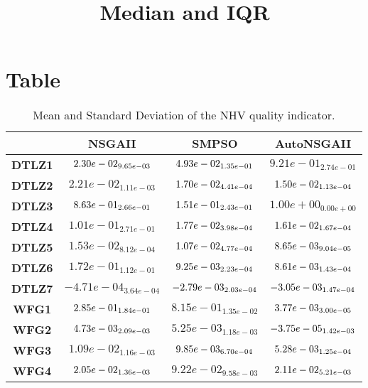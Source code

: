 \documentclass{article}
\title{Median and IQR}
\author{}
\begin{document}
\maketitle
\section{Table}
\begin{table}[!htp]
  \caption{Mean and Standard Deviation of the NHV quality indicator.}
  \label{table:NHV}
  \centering
  \begin{scriptsize}
  \begin{tabular}{c|ccc}
      & \textbf{NSGAII} & \textbf{SMPSO} & \textbf{AutoNSGAII} \\\hline
      \textbf{DTLZ1} & $\cellcolor{gray95} 2.30e-02_{9.65e-03} $ & $ \cellcolor{gray25} 4.93e-02_{1.35e-01} $ & $ 9.21e-01_{2.74e-01}$ \\
      \textbf{DTLZ2} & $2.21e-02_{1.11e-03} $ & $ \cellcolor{gray25} 1.70e-02_{4.41e-04} $ & $ \cellcolor{gray95} 1.50e-02_{1.13e-04}$ \\
      \textbf{DTLZ3} & $\cellcolor{gray25} 8.63e-01_{2.66e-01} $ & $ \cellcolor{gray95} 1.51e-01_{2.43e-01} $ & $ 1.00e+00_{0.00e+00}$ \\
      \textbf{DTLZ4} & $1.01e-01_{2.71e-01} $ & $ \cellcolor{gray25} 1.77e-02_{3.98e-04} $ & $ \cellcolor{gray95} 1.61e-02_{1.67e-04}$ \\
      \textbf{DTLZ5} & $1.53e-02_{8.12e-04} $ & $ \cellcolor{gray25} 1.07e-02_{4.77e-04} $ & $ \cellcolor{gray95} 8.65e-03_{9.04e-05}$ \\
      \textbf{DTLZ6} & $1.72e-01_{1.12e-01} $ & $ \cellcolor{gray25} 9.25e-03_{2.23e-04} $ & $ \cellcolor{gray95} 8.61e-03_{1.43e-04}$ \\
      \textbf{DTLZ7} & $-4.71e-04_{3.64e-04} $ & $ \cellcolor{gray25} -2.79e-03_{2.03e-04} $ & $ \cellcolor{gray95} -3.05e-03_{1.47e-04}$ \\
      \textbf{WFG1} & $\cellcolor{gray25} 2.85e-01_{1.84e-01} $ & $ 8.15e-01_{1.35e-02} $ & $ \cellcolor{gray95} 3.77e-03_{3.00e-05}$ \\
      \textbf{WFG2} & $\cellcolor{gray25} 4.73e-03_{2.09e-03} $ & $ 5.25e-03_{1.18e-03} $ & $ \cellcolor{gray95} -3.75e-05_{1.42e-03}$ \\
      \textbf{WFG3} & $1.09e-02_{1.16e-03} $ & $ \cellcolor{gray25} 9.85e-03_{6.70e-04} $ & $ \cellcolor{gray95} 5.28e-03_{1.25e-04}$ \\
      \textbf{WFG4} & $\cellcolor{gray95} 2.05e-02_{1.36e-03} $ & $ 9.22e-02_{9.58e-03} $ & $ \cellcolor{gray25} 2.11e-02_{5.21e-03}$ \\

\end{tabular}
\end{scriptsize}
\end{table}
\end{document}
